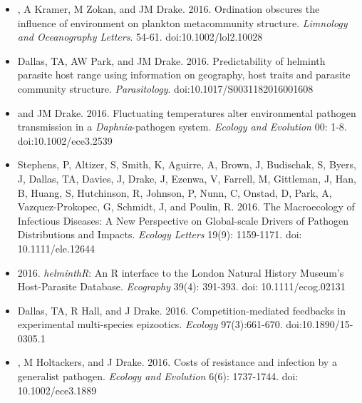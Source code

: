\documentclass[]{CV}
\begin{document}
{}
\begin{itemize}

\item {}, A Kramer, M Zokan, and JM Drake. 2016. Ordination obscures the influence of environment on plankton metacommunity structure. \textit{Limnology and Oceanography Letters}. 54-61. doi:10.1002/lol2.10028

\item {\mefont Dallas, TA}, AW Park, and JM Drake. 2016. Predictability of helminth parasite host range using information on geography, host traits and parasite community structure. \textit{Parasitology}. doi:10.1017/S0031182016001608

\item {} and JM Drake. 2016. Fluctuating temperatures alter environmental pathogen transmission in a \textit{Daphnia}-pathogen system. \textit{Ecology and Evolution} 00: 1-8. doi:10.1002/ece3.2539

\item \OA Stephens, P, Altizer, S, Smith, K, Aguirre, A, Brown, J, Budischak, S, Byers, J, {\mefont Dallas, TA}, Davies, J, Drake, J, Ezenwa, V, Farrell, M, Gittleman, J, Han, B, Huang, S, Hutchinson, R, Johnson, P, Nunn, C, Onstad, D, Park, A, Vazquez-Prokopec, G, Schmidt, J, and Poulin, R. 2016. The Macroecology of Infectious Diseases: A New Perspective on Global-scale Drivers of Pathogen Distributions and Impacts. \textit{Ecology Letters} 19(9): 1159-1171. doi: 10.1111/ele.12644

\item {} 2016. \textit{helminthR}: An R interface to the London Natural History Museum's Host-Parasite Database. \textit{Ecography} 39(4): 391-393. doi: 10.1111/ecog.02131 

\item {\mefont Dallas, TA}, R Hall, and J Drake. 2016. Competition-mediated feedbacks in experimental multi-species epizootics. \textit{Ecology} 97(3):661-670. doi:10.1890/15-0305.1 

\item {}, M Holtackers, and J Drake. 2016. Costs of resistance and infection by a generalist pathogen. \textit{Ecology and Evolution} 6(6): 1737-1744. doi: 10.1002/ece3.1889 

\end{itemize}



{}
\end{document}
